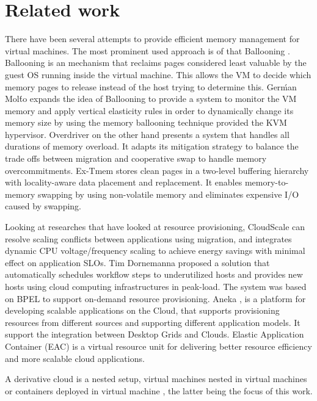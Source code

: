 
\chapter{Related work}

  There have been several attempts to provide efficient memory management for virtual machines. The most prominent used approach is of 
that Ballooning \cite{waldspurger2002memory}. Ballooning is an mechanism that reclaims pages considered least valuable by the guest OS 
running inside the virtual machine. This allows the VM to decide which memory pages to release instead of the host trying to determine this.
Gerḿan Molt́o \cite{molto2013elastic} expands the idea of Ballooning to provide a system to monitor the VM memory and apply vertical 
elasticity rules in order to dynamically change its memory size by using the memory ballooning technique provided the KVM hypervisor. 
Overdriver \cite{williams2011overdriver} on the other hand presents a system that handles all durations of memory overload. It adapts its 
mitigation strategy to balance the trade offs between migration and cooperative swap to handle memory overcommitments. Ex-Tmem 
\cite{venkatesan2014ex} stores clean pages in a two-level buffering hierarchy with locality-aware data placement and replacement. It 
enables memory-to-memory swapping by using non-volatile memory and eliminates expensive I/O caused by swapping.
  
  Looking at researches that have looked at resource provisioning, CloudScale \cite{shen2011cloudscale} can resolve scaling conflicts 
between applications using migration, and integrates dynamic CPU voltage/frequency scaling to achieve energy savings with minimal effect on 
application SLOs. Tim Dornemanna\cite{dornemann2009demand} proposed a solution that automatically schedules workflow steps to underutilized 
hosts and provides new hosts using cloud computing infrastructures in peak-load. The system was based on BPEL to support on-demand resource 
provisioning. Aneka \cite{calheiros2012aneka}, is a platform for developing scalable applications on the Cloud, that supports provisioning 
resources from different sources and supporting different application models. It support the integration between Desktop Grids and Clouds. 
Elastic Application Container (EAC) \cite{he2012elastic} is a virtual resource unit for delivering better resource efficiency and more 
scalable cloud applications. 

  A derivative cloud is a nested setup, virtual machines nested in virtual machines\cite{williams2012xen} or containers deployed in virtual machine 
  \cite{sharma2015spotcheck, gcp}, the latter being the focus of this work.  

